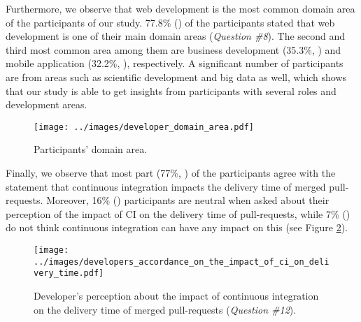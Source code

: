 	Furthermore, we observe that web development is the most common domain area of the participants of our study. 77.8\% () of the participants stated that web development is one of their main domain areas (\textit{Question \#8}). The second and third most common area among them are business development (35.3\%, ) and mobile application (32.2\%, ), respectively. A significant number of participants are from areas such as scientific development and big data as well, which shows that our study is able to get insights from participants with several roles and development areas.

	\begin{figure}[H]
	\texttt{[image: ../images/developer\_domain\_area.pdf]}
	\caption{Participants' domain area.}
	\label{fig:developer_domain_area}       %
	\end{figure}

	Finally, we observe that most part (77\%, ) of the participants agree with the statement that continuous integration impacts the delivery time of merged pull-requests. Moreover, 16\% () participants are neutral when asked about their perception of the impact of CI on the delivery time of pull-requests, while 7\% () do not think continuous integration can have any impact on this (see Figure \ref{fig:developer_perception_about_impact_of_ci_on_delivery_time}).
	
	\begin{figure}[H]
		\texttt{[image: ../images/developers\_accordance\_on\_the\_impact\_of\_ci\_on\_delivery\_time.pdf]}
		\caption{Developer's perception about the impact of continuous integration on the delivery time of merged pull-requests (\textit{Question \#12}).}
		\label{fig:developer_perception_about_impact_of_ci_on_delivery_time}       %
	\end{figure}



